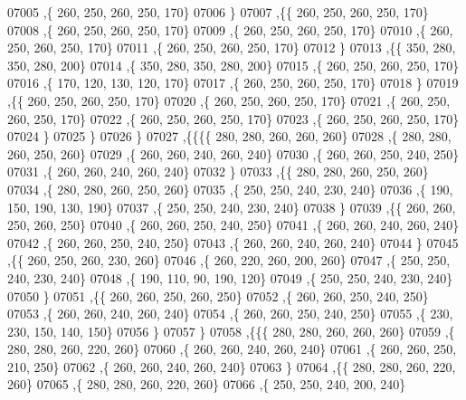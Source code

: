 \begin{DoxyCode}
07005     ,\{   260,   250,   260,   250,   170\}
07006     \}
07007    ,\{\{   260,   250,   260,   250,   170\}
07008     ,\{   260,   250,   260,   250,   170\}
07009     ,\{   260,   250,   260,   250,   170\}
07010     ,\{   260,   250,   260,   250,   170\}
07011     ,\{   260,   250,   260,   250,   170\}
07012     \}
07013    ,\{\{   350,   280,   350,   280,   200\}
07014     ,\{   350,   280,   350,   280,   200\}
07015     ,\{   260,   250,   260,   250,   170\}
07016     ,\{   170,   120,   130,   120,   170\}
07017     ,\{   260,   250,   260,   250,   170\}
07018     \}
07019    ,\{\{   260,   250,   260,   250,   170\}
07020     ,\{   260,   250,   260,   250,   170\}
07021     ,\{   260,   250,   260,   250,   170\}
07022     ,\{   260,   250,   260,   250,   170\}
07023     ,\{   260,   250,   260,   250,   170\}
07024     \}
07025    \}
07026   \}
07027  ,\{\{\{\{   280,   280,   260,   260,   260\}
07028     ,\{   280,   280,   260,   250,   260\}
07029     ,\{   260,   260,   240,   260,   240\}
07030     ,\{   260,   260,   250,   240,   250\}
07031     ,\{   260,   260,   240,   260,   240\}
07032     \}
07033    ,\{\{   280,   280,   260,   250,   260\}
07034     ,\{   280,   280,   260,   250,   260\}
07035     ,\{   250,   250,   240,   230,   240\}
07036     ,\{   190,   150,   190,   130,   190\}
07037     ,\{   250,   250,   240,   230,   240\}
07038     \}
07039    ,\{\{   260,   260,   250,   260,   250\}
07040     ,\{   260,   260,   250,   240,   250\}
07041     ,\{   260,   260,   240,   260,   240\}
07042     ,\{   260,   260,   250,   240,   250\}
07043     ,\{   260,   260,   240,   260,   240\}
07044     \}
07045    ,\{\{   260,   250,   260,   230,   260\}
07046     ,\{   260,   220,   260,   200,   260\}
07047     ,\{   250,   250,   240,   230,   240\}
07048     ,\{   190,   110,    90,   190,   120\}
07049     ,\{   250,   250,   240,   230,   240\}
07050     \}
07051    ,\{\{   260,   260,   250,   260,   250\}
07052     ,\{   260,   260,   250,   240,   250\}
07053     ,\{   260,   260,   240,   260,   240\}
07054     ,\{   260,   260,   250,   240,   250\}
07055     ,\{   230,   230,   150,   140,   150\}
07056     \}
07057    \}
07058   ,\{\{\{   280,   280,   260,   260,   260\}
07059     ,\{   280,   280,   260,   220,   260\}
07060     ,\{   260,   260,   240,   260,   240\}
07061     ,\{   260,   260,   250,   210,   250\}
07062     ,\{   260,   260,   240,   260,   240\}
07063     \}
07064    ,\{\{   280,   280,   260,   220,   260\}
07065     ,\{   280,   280,   260,   220,   260\}
07066     ,\{   250,   250,   240,   200,   240\}

\end{DoxyCode}
